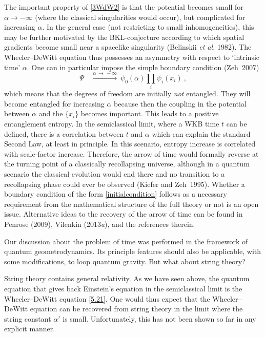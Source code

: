\documentclass[12pt]{article}
\newcommand{\lb}{\label}
\begin{document}
The important property of \eqref{3WdW2} is
that the potential becomes small for $\alpha\to -\infty$ (where the
classical singularities would occur), but complicated for increasing
$\alpha$. In the general case (not restricting to small
inhomogeneities), this may be further motivated by the
BKL-conjecture according to which spatial gradients become small
near a spacelike singularity (Belinskii {\em et al.} 1982). 
The Wheeler--DeWitt
equation thus possesses an asymmetry with respect to `intrinsic
time' $\alpha$. 
One can in particular impose the simple boundary
condition (Zeh~2007)
\begin{equation}
\lb{initialcondition}
\Psi \quad \stackrel{\alpha \, \to \, -\infty}{\longrightarrow}\
\psi_0(\alpha)\prod_i \psi_i(x_i)\ ,
\end{equation}
which means that the degrees of freedom are initially {\em not}
entangled. They will become entangled for increasing $\alpha$ because
then the coupling in the potential between $\alpha$ and the $\{ x_i\}$
becomes important. This leads to a positive entanglement entropy. In
the semiclassical limit, where a WKB time $t$ can be defined, there is
a correlation between $t$ and $\alpha$ which can explain the standard
Second Law, at least in principle. In this scenario, entropy increase
is correlated with scale-factor increase. Therefore, the arrow of time
would formally reverse at the turning point of a classically
recollapsing universe, although in a quantum scenario the classical
evolution would end there and no transition to a recollapsing phase
could ever be observed (Kiefer and Zeh~1995). Whether a boundary
condition of the form \eqref{initialcondition} follows as a necessary
requirement from the mathematical structure of the full theory or
not is an open issue.
Alternative ideas to the recovery of the arrow of time can be found in
Penrose (2009), Vilenkin (2013{\em a}), and the references therein. 
 
Our discussion about the problem of time was performed in the
framework of quantum 
geometrodynamics. Its principle features should also be applicable,
with some modifications, to loop quantum gravity. But what about
string theory?

String theory contains general relativity. As we have seen above, the
quantum equation that gives back Einstein's equation in the
semiclassical limit is the Wheeler--DeWitt equation \eqref{5.21}. One
would thus expect that the  Wheeler--DeWitt equation can be recovered
from string theory in the limit where the string constant $\alpha'$ is
small. Unfortunately, this has not been shown so far in any explicit manner.
\end{document}
